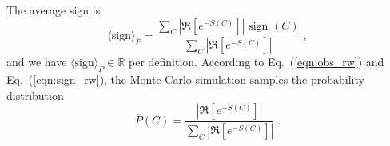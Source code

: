 The average sign is 
\begin{equation}\label{eqn:sign_rw}
	 \langle \text{sign} \rangle_{\overline{P}} =    \frac { \sum_{C}  \left|  \Re \left[ e^{-S(C)} \right]   \right|   \text{ sign }(C) }  {  \sum_{C}   \left| \Re \left[ e^{-S(C)} \right] \right|  } \;,
\end{equation}
and we have  $\langle \text{sign} \rangle_{\overline{P}} \in \mathbb{R}$ per definition.
According to Eq.~(\ref{eqn:obs_rw}) and Eq.~(\ref{eqn:sign_rw}), the Monte Carlo simulation samples the probability distribution 
\begin{equation}  
	 \overline{P}(C) = \frac{ \left|  \Re \left[ e^{-S(C)} \right] \right| }{\sum_C \left|  \Re \left[ e^{-S(C)} \right]  \right| }\;.
\end{equation}


 
